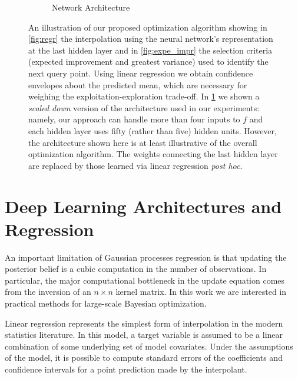 \documentclass[]{article}
\newcommand{\1}{\mathbf{1}}
\newcommand{\0}{\mathbf{0}}
\begin{document}
\begin{figure}
\begin{subfigure}[b]{0.3\textwidth}
{
	}
	\caption{Network Architecture}
	\label{fig:arch}
\end{subfigure}
\caption{An illustration of our proposed optimization algorithm showing in \ref{fig:regr} the interpolation using the neural network's representation at the last hidden layer and in \ref{fig:expe_impr} the selection criteria (expected improvement and greatest variance) used to identify the next query point. Using linear regression we obtain confidence envelopes about the predicted mean, which are necessary for weighing the exploitation-exploration trade-off. In \ref{fig:arch} we shown a \textit{scaled down} version of the architecture used in our experiments: namely, our approach can handle more than four inputs to $f$ and each hidden layer uses fifty (rather than five) hidden units. However, the architecture shown here is at least illustrative of the overall optimization algorithm. The weights connecting the last hidden layer are replaced by those learned via linear regression \textit{post hoc}.}
\label{fig:regr-expe-impr-arch}
\end{figure}

\section{Deep Learning Architectures and Regression}
\label{sec:deep-lear-arch-regr}

An important limitation of Gaussian processes regression is that updating the posterior belief is a cubic computation in the number of observations. In particular, the major computational bottleneck in the update equation comes from the inversion of an $n\times n$ kernel matrix. In this work we are interested in practical methods for large-scale Bayesian optimization. 

Linear regression represents the simplest form of interpolation in the modern statistics literature. In this model, a target variable is assumed to be a linear combination of some underlying set of model covariates. Under the assumptions of the model, it is possible to compute standard errors of the coefficients and confidence intervals for a point prediction made by the interpolant. 
\end{document}
